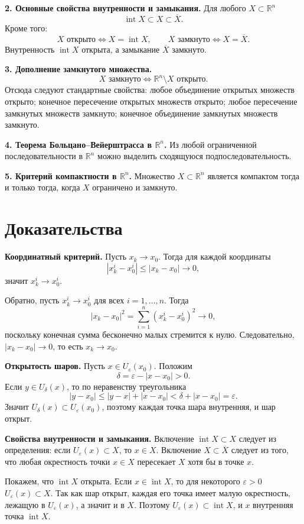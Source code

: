 \documentclass[12pt,a4paper]{article}
\newcommand{\R}{\mathbb{R}}
\newcommand{\eps}{\varepsilon}
\newcommand{\Ball}[2]{U_{#1}(#2)}
\begin{document}
\textbf{2. Основные свойства внутренности и замыкания.}
Для любого \(X\subset\R^n\)
\[
  \operatorname{int}X\subset X\subset\overline X.
\]
Кроме того:
\[
  X\text{ открыто}\Longleftrightarrow X=\operatorname{int}X,\qquad
  X\text{ замкнуто}\Longleftrightarrow X=\overline X.
\]
Внутренность \(\operatorname{int}X\) открыта, а замыкание \(\overline X\)
замкнуто.

\textbf{3. Дополнение замкнутого множества.}
\[
  X\text{ замкнуто}\Longleftrightarrow \R^n\setminus X\text{ открыто}.
\]
Отсюда следуют стандартные свойства: любое объединение открытых множеств
открыто; конечное пересечение открытых множеств открыто; любое пересечение
замкнутых множеств замкнуто; конечное объединение замкнутых множеств
замкнуто.

\textbf{4. Теорема Больцано--Вейерштрасса в \(\R^n\).}
Из любой ограниченной последовательности в \(\R^n\) можно выделить сходящуюся
подпоследовательность.

\textbf{5. Критерий компактности в \(\R^n\).}
Множество \(X\subset\R^n\) является компактом тогда и только тогда, когда
\(X\) ограничено и замкнуто.

\section*{Доказательства}

\textbf{Координатный критерий.}
Пусть \(x_k\to x_0\). Тогда для каждой координаты
\[
  |x_k^i-x_0^i|\le |x_k-x_0|\to 0,
\]
значит \(x_k^i\to x_0^i\).

Обратно, пусть \(x_k^i\to x_0^i\) для всех \(i=1,\dots,n\). Тогда
\[
  |x_k-x_0|^2
  =\sum_{i=1}^n (x_k^i-x_0^i)^2 \to 0,
\]
поскольку конечная сумма бесконечно малых стремится к нулю. Следовательно,
\(|x_k-x_0|\to0\), то есть \(x_k\to x_0\).

\textbf{Открытость шаров.}
Пусть \(x\in\Ball{\eps}{x_0}\). Положим
\[
  \delta=\eps-|x-x_0|>0.
\]
Если \(y\in\Ball{\delta}{x}\), то по неравенству треугольника
\[
  |y-x_0|\le |y-x|+|x-x_0|<\delta+|x-x_0|=\eps.
\]
Значит \(\Ball{\delta}{x}\subset\Ball{\eps}{x_0}\), поэтому каждая точка шара
внутренняя, и шар открыт.

\textbf{Свойства внутренности и замыкания.}
Включение \(\operatorname{int}X\subset X\) следует из определения: если
\(\Ball{\eps}{x}\subset X\), то \(x\in X\). Включение \(X\subset\overline X\)
следует из того, что любая окрестность точки \(x\in X\) пересекает \(X\) хотя
бы в точке \(x\).

Покажем, что \(\operatorname{int}X\) открыта. Если
\(x\in\operatorname{int}X\), то для некоторого \(\eps>0\)
\(\Ball{\eps}{x}\subset X\). Так как шар открыт, каждая его точка имеет малую
окрестность, лежащую в \(\Ball{\eps}{x}\), а значит и в \(X\). Поэтому
\(\Ball{\eps}{x}\subset \operatorname{int}X\), и \(x\) внутренняя точка
\(\operatorname{int}X\).
\end{document}
